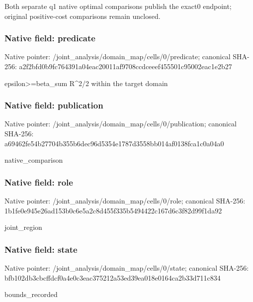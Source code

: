 \documentclass[10pt,a4paper]{article}
\begin{document}
\begingroup\raggedright\sloppy Both separate q1 native optimal comparisons publish the exact0 endpoint;\allowbreak{} original positive-cost comparisons remain unclosed.\par\endgroup

\subsubsection{Native field: predicate}
Native pointer: /joint\_\allowbreak{}analysis/domain\_\allowbreak{}map/cells/0/predicate; canonical SHA-256: a2f2bfd0b9fc764391a04eac20011af9708ccdceeef455501c95002eac1e2b27

\begingroup\raggedright\sloppy epsilon>=\allowbreak{}beta\_\allowbreak{}sum R\textasciicircum{}2/\allowbreak{}2 within the target domain\par\endgroup

\subsubsection{Native field: publication}
Native pointer: /joint\_\allowbreak{}analysis/domain\_\allowbreak{}map/cells/0/publication; canonical SHA-256: a69462fe54b27704b355b6dec96d5354e1787d3558bb014af0138fca1c0a04a0

\begingroup\raggedright\sloppy native\_\allowbreak{}comparison\par\endgroup

\subsubsection{Native field: role}
Native pointer: /joint\_\allowbreak{}analysis/domain\_\allowbreak{}map/cells/0/role; canonical SHA-256: 1b1fe0e945e26ad153b0c6e5a2c8d455f335b5494422c167d6c3f82d99f1da92

\begingroup\raggedright\sloppy joint\_\allowbreak{}region\par\endgroup

\subsubsection{Native field: state}
Native pointer: /joint\_\allowbreak{}analysis/domain\_\allowbreak{}map/cells/0/state; canonical SHA-256: bfb102db3cbcffdcf0a4e0c3eac375212a53ed39ea018e0164ca2b33d711c834

\begingroup\raggedright\sloppy bounds\_\allowbreak{}recorded\par\endgroup
\end{document}
